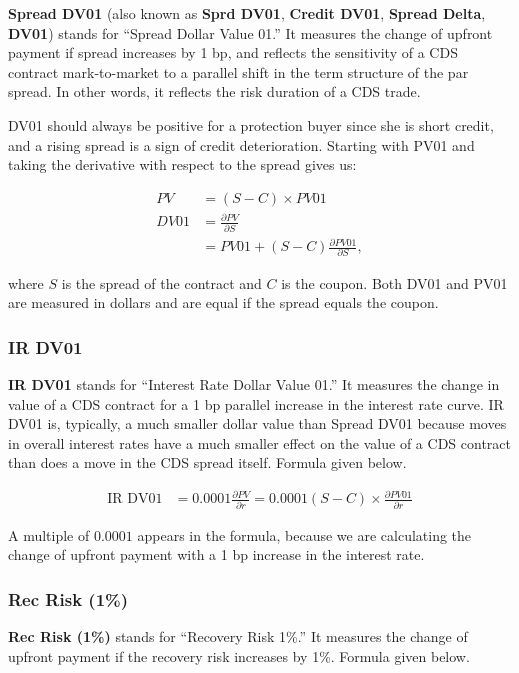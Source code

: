 \documentclass{jss}
\begin{document}
\textbf{Spread DV01} (also known as \textbf{Sprd DV01}, \textbf{Credit DV01}, \textbf{Spread Delta}, \textbf{DV01}) stands for ``Spread Dollar Value 01.'' It measures the change of upfront payment if spread increases by 1 bp, and reflects the sensitivity of a CDS contract mark-to-market to a parallel shift in the term structure of the par spread. In other words, it reflects the risk duration of a CDS trade. 

DV01 should always be positive for a protection buyer since she is short credit, and a rising spread is a sign of credit deterioration. Starting with PV01 and taking the derivative with respect to the spread gives us:

\begin{align*}
  PV &= (S - C) \times PV01 \\
  DV01 &= \frac{\partial PV}{\partial S} \\
  &= PV01 + (S - C) \frac{\partial PV01}{\partial S},
\end{align*}

where $S$ is the spread of the contract and $C$ is the coupon. Both DV01 and PV01 are measured in dollars and are equal if the spread equals the coupon.

\subsubsection{IR DV01}
\label{sec:IRDV01}
\textbf{IR DV01} stands for ``Interest Rate Dollar Value 01.'' It measures the change in value of a CDS contract for a 1 bp parallel increase in the interest rate curve. IR DV01 is, typically, a much smaller dollar value than Spread DV01 because moves in overall interest rates have a much smaller effect on the value of a CDS contract than does a move in the CDS spread itself. Formula given below.

\begin{align*}
  \text{IR DV01} &= 0.0001 \frac{\partial PV}{\partial r} = 0.0001 (S - C) \times \frac{\partial PV01}{\partial r}
\end{align*}

A multiple of $0.0001$ appears in the formula, because we are calculating the change of upfront payment with a 1 bp increase in the interest rate.

\subsubsection{Rec Risk (1\%)}
\textbf{Rec Risk (1\%)} stands for ``Recovery Risk 1\%.'' It measures the change of upfront payment if the recovery risk increases by 1\%. Formula given below.
\end{document}
